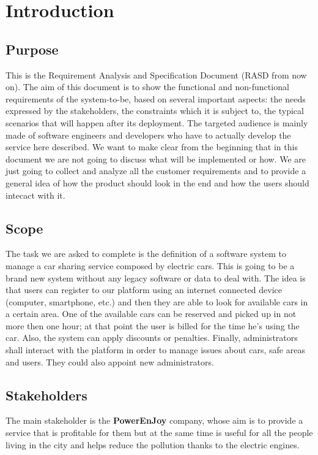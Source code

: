 \section{Introduction}

\subsection{Purpose}
    This is the Requirement Analysis and Specification Document (RASD from now on).
    The aim of this document is to show the functional and non-functional requirements
    of the system-to-be, based on several important aspects:
    the needs expressed by the stakeholders, the constraints which it is subject to,
    the typical scenarios that will happen after its deployment.
    The targeted audience is mainly made of software engineers and developers who have
    to actually develop the service here described.
    We want to make clear from the beginning that in this document we are not going to
    discuss what will be implemented or how. We are just going to collect and analyze
    all the customer requirements and to provide a general idea of how the product should
    look in the end and how the users should intecact with it.

\subsection{Scope}
    The task we are asked to complete is the definition of a software system to manage a car sharing
    service composed by electric cars. This is going to be a brand new system without any
    legacy software or data to deal with. The idea is that users can register to our platform
    using an internet connected device (computer, smartphone, etc.) and then they are able to
    look for available cars in a certain area. 
    One of the available cars can be reserved and picked up in not more then one hour; at that
    point the user is billed for the time he's using the car.
    Also, the system can apply discounts or penalties.
    Finally, administrators shall interact with the platform in order to manage issues about cars, safe areas and users. They could also appoint new administrators.

\subsection{Stakeholders}
    The main stakeholder is the \textbf{PowerEnJoy} company, whose aim is to provide a service
    that is profitable for them but at the same time is useful for all the people living in the
    city and helps reduce the pollution thanks to the electric engines.

